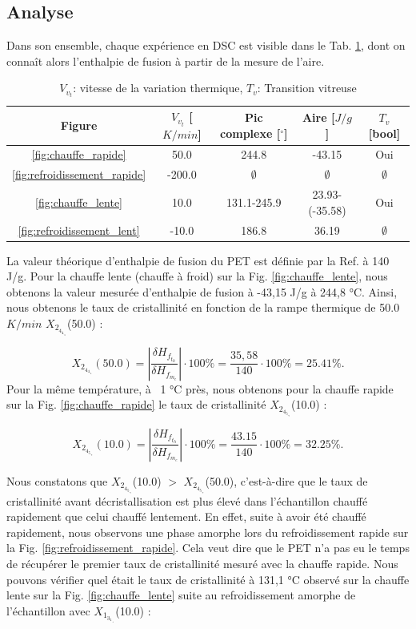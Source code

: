\subsection{Analyse}

Dans son ensemble, chaque expérience en DSC est visible dans le Tab. \ref{val:peaks}, dont on connaît alors l’enthalpie de fusion à partir de la mesure de l’aire.

\begin{table}[!ht]
\centering
\footnotesize
\setlength{\tabcolsep}{4pt}
\renewcommand{\arraystretch}{0.9}
\begin{tabular}{|c|c|c|c|c|}
\hline
        \textbf{Figure}
        & \textbf{$V_v_t$ [$K/min$]}
        & \textbf{Pic complexe [$^\circ$]}
        & \textbf{Aire [$J/g$]}
        & \textbf{$T_v$ [bool]}
\\\hline
        \ref{fig:chauffe_rapide} & 50.0 & 244.8 & -43.15 & Oui  \\
        \ref{fig:refroidissement_rapide} & -200.0 & $\emptyset$ & $\emptyset$ & $\emptyset$  \\
        \ref{fig:chauffe_lente} & 10.0 & 131.1-245.9 & 23.93-(-35.58) & Oui \\
        \ref{fig:refroidissement_lent} & -10.0 & 186.8 & 36.19 & $\emptyset$ \\
\hline
\end{tabular}
        \caption{$V_v_t$: vitesse de la variation thermique, $T_v$: Transition vitreuse}
\label{val:peaks}
\end{table}
La valeur théorique d’enthalpie de fusion du PET est définie par la Ref. \cite{petnet} à 140 J/g. Pour la chauffe lente (chauffe à froid) sur la Fig. \ref{fig:chauffe_lente}, nous obtenons la valeur mesurée d’enthalpie de fusion à -43,15 J/g à 244,8 °C. Ainsi, nous obtenons le taux de cristallinité en fonction de la rampe thermique de 50.0 $K/min$ $X_2_4_4_._8$(50.0) :


\[
	X_2_4_4_._8(50.0) = |\frac{\delta H_f_t_h}{\delta H_f_m_e}| \cdot 100\% = \frac{35,58}{140} \cdot 100 \% = 25.41 \%.
\]
Pour la même température, à ~1 °C près, nous obtenons pour la chauffe rapide sur la Fig. \ref{fig:chauffe_rapide} le taux de cristallinité $X_2_4_5_._9$(10.0) :

\[
	X_2_4_5_._9(10.0) = |\frac{\delta H_f_t_h}{\delta H_f_m_e}| \cdot 100\% = \frac{43.15}{140} \cdot 100\% = 32.25 \%.
\]

Nous constatons que $X_2_4_5_._9$(10.0) $>$ $X_2_4_5_._9$(50.0), c’est-à-dire que le taux de cristallinité avant décristallisation est plus élevé dans l’échantillon chauffé rapidement que celui chauffé lentement. En effet, suite à avoir été chauffé rapidement, nous observons une phase amorphe lors du refroidissement rapide sur la Fig. \ref{fig:refroidissement_rapide}. Cela veut dire que le PET n’a pas eu le temps de récupérer le premier taux de cristallinité mesuré avec la chauffe rapide. Nous pouvons vérifier quel était le taux de cristallinité à 131,1 °C observé sur la chauffe lente sur la Fig. \ref{fig:chauffe_lente} suite au refroidissement amorphe de l’échantillon avec $X_1_3_1_._1$(10.0) :

